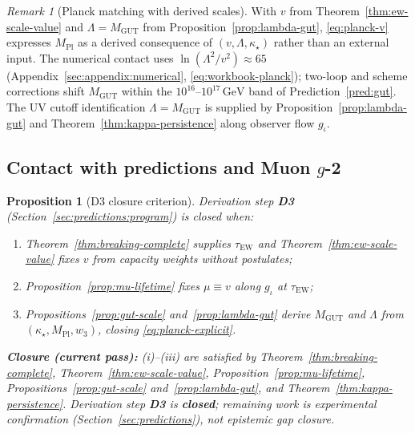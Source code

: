 \documentclass[aps,prd,onecolumn,amsmath,amssymb,nofootinbib,11pt]{revtex4-2}
\numberwithin{equation}{section}
\theoremstyle{plain}
\newtheorem{proposition}[theorem]{Proposition}
\theoremstyle{definition}
\theoremstyle{remark}
\newtheorem{remark}[theorem]{Remark}
\newcommand{\MPl}{M_{\mathrm{Pl}}}
\begin{document}
\begin{remark}[Planck matching with derived scales]
With $v$ from Theorem~\ref{thm:ew-scale-value} and
$\Lambda=M_{\mathrm{GUT}}$ from Proposition~\ref{prop:lambda-gut},
\eqref{eq:planck-v} expresses $\MPl$ as a derived consequence of
$(v,\Lambda,\kappa_\star)$ rather than an external input. The numerical
contact uses $\ln(\Lambda^2/v^2)\approx 65$ (Appendix~\ref{sec:appendix:numerical},
\eqref{eq:workbook-planck}); two-loop and scheme corrections shift
$M_{\mathrm{GUT}}$ within the $10^{16}$--$10^{17}\,\mathrm{GeV}$ band of
Prediction~\ref{pred:gut}. The UV cutoff identification $\Lambda=M_{\mathrm{GUT}}$ is supplied by
Proposition~\ref{prop:lambda-gut} and Theorem~\ref{thm:kappa-persistence}
along observer flow $g_\iota$.
\end{remark}

\subsection{Contact with predictions and Muon $g$-2}
\label{sec:scales:contact}

\begin{proposition}[D3 closure criterion]
\label{prop:d3-closure}
Derivation step \textbf{D3} (Section~\ref{sec:predictions:program}) is
\emph{closed} when:
\begin{enumerate}[label=(\roman*),leftmargin=*]
  \item Theorem~\ref{thm:breaking-complete} supplies
    $\tau_{\mathrm{EW}}$ and Theorem~\ref{thm:ew-scale-value} fixes $v$
    from capacity weights without postulates;
  \item Proposition~\ref{prop:mu-lifetime} fixes $\mu\equiv v$ along
    $g_\iota$ at $\tau_{\mathrm{EW}}$;
  \item Propositions~\ref{prop:gut-scale} and~\ref{prop:lambda-gut} derive
    $M_{\mathrm{GUT}}$ and $\Lambda$ from $(\kappa_\star,\MPl,w_3)$, closing
    \eqref{eq:planck-explicit}.
\end{enumerate}
\textbf{Closure (current pass):} (i)--(iii) are satisfied by
Theorem~\ref{thm:breaking-complete}, Theorem~\ref{thm:ew-scale-value},
Proposition~\ref{prop:mu-lifetime}, Propositions~\ref{prop:gut-scale}
and~\ref{prop:lambda-gut}, and Theorem~\ref{thm:kappa-persistence}.
Derivation step \textbf{D3} is \textbf{closed}; remaining work is experimental
confirmation (Section~\ref{sec:predictions}), not epistemic gap closure.
\end{proposition}
\end{document}
